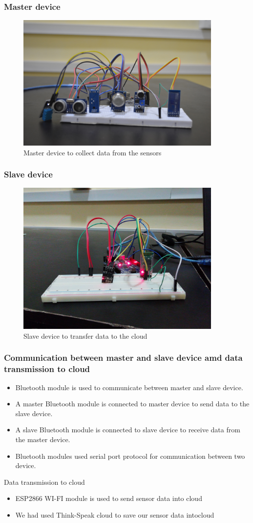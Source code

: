 \documentclass{beamer}
\begin{document}
\begin{frame}\frametitle{Master device}
  \begin{figure}[H]
  \centerline{\includegraphics[width=4.0in]{master2.JPG}}
  \caption{ \textbf{}Master device to collect data from the sensors}
  \end{figure}
\end{frame}
\begin{frame}\frametitle{Slave  device}
  \begin{figure}
  \centerline{\includegraphics[width=4.0in]{sl}}
  \caption{ \textbf{}Slave device to transfer data to the cloud}
  \end{figure}
\end{frame}
\begin{frame}\frametitle{Communication between master and slave device amd data transmission to cloud }
\begin{itemize}
\item Bluetooth module is used to communicate between master and slave device.
\item A master Bluetooth module is connected to master device to send data to the slave device. 
\item A slave Bluetooth module is connected to slave device to receive data from the master device.
\item Bluetooth modules used serial port protocol for communication between two device.
\end{itemize}
\item Data transmission to cloud
\begin{itemize}
    \item ESP2866 WI-FI module is used to send sensor data into cloud
    \item We had used Think-Speak cloud to save our sensor data intocloud
\end{itemize}
\end{frame}
\end{document}
